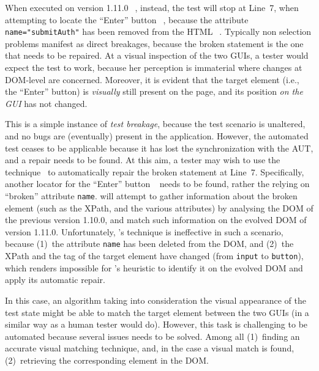 When executed on version 1.11.0~\textcircled{}, instead, the test will stop at Line~7, when attempting to locate the ``Enter'' button~\textcircled{}, because the attribute \mbox{\texttt{name="submitAuth"}} has been removed from the HTML~\textcircled{}. Typically non selection problems manifest as direct breakages, because the broken statement is the one that needs to be repaired.  
%
At a visual inspection of the two GUIs, a tester would expect the test to work, because her perception is immaterial where changes at DOM-level are concerned. Moreover, it is evident that the target element (i.e., the ``Enter'' button) is \textit{visually} still present on the page, and its position \textit{on the GUI} has not changed.
 
This is a simple instance of \textit{test breakage}, because the test scenario is unaltered, and no bugs are (eventually) present in the application. However, the automated test ceases to be applicable because it has lost the synchronization with the AUT, and a repair needs to be found.
At this aim, a tester may wish to use the \water  technique~\cite{Choudhary:2011:WWA:2002931.2002935} to automatically repair the broken statement at Line~7. Specifically, another locator for the ``Enter'' button~\textcircled{} needs to be found, rather the relying on ``broken'' attribute \texttt{name}. \water will attempt to gather information about the broken element (such as the XPath, and the various attributes) by analysing the DOM of the previous version 1.10.0, and match such information on the evolved DOM of version 1.11.0. Unfortunately, \water's technique is ineffective in such a scenario, because (1)~the attribute \texttt{name} has been deleted from the DOM, and (2)~the XPath and the tag of the target element have changed (from \mbox{\texttt{input}} to \mbox{\texttt{button}}), which renders impossible for \water's heuristic to identify it on the evolved DOM and apply its automatic repair.
 
In this case, an algorithm taking into consideration the visual appearance of the test state might be able to match the target element between the two GUIs (in a similar way as a human tester would do). However, this task is challenging to be automated because several issues needs to be solved. Among all (1)~finding an accurate visual matching technique, and, in the case a visual match is found, (2)~retrieving the corresponding element in the DOM. 

